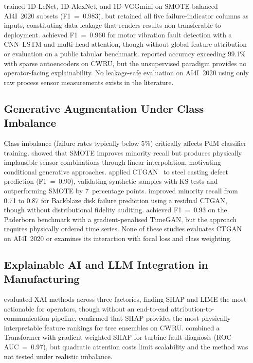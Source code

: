 \documentclass[sensors,article,submit,pdftex,moreauthors]{Definitions/mdpi}
\begin{document}
\citet{ref-base-ileri2024} trained 1D-LeNet, 1D-AlexNet, and
1D-VGGmini on SMOTE-balanced AI4I~2020 subsets (F1~=~0.983), but
retained all five failure-indicator columns as inputs, constituting
data leakage that renders results non-transferable to deployment.
\citet{ref-cnn-lstm-fault2023} achieved F1~=~0.960 for motor vibration
fault detection with a CNN--LSTM and multi-head attention, though
without global feature attribution or evaluation on a public tabular
benchmark.
\citet{ref-autoencoder-pdm2023} reported accuracy exceeding 99.1\%
with sparse autoencoders on CWRU, but the unsupervised paradigm
provides no operator-facing explainability.
No leakage-safe evaluation on AI4I~2020 using only raw process sensor
measurements exists in the literature.

\subsection{Generative Augmentation Under Class Imbalance}

Class imbalance (failure rates typically below 5\%) critically affects
PdM classifier training.
\citet{ref-smote-fault2022} showed that SMOTE improves minority recall
but produces physically implausible sensor combinations through linear
interpolation, motivating conditional generative approaches.
\citet{ref-ctgan-steel2025} applied CTGAN~\citep{ref-ctgan-original}
to steel casting defect prediction (F1~=~0.90), validating synthetic
samples with KS tests and outperforming SMOTE by 7~percentage points.
\citet{ref-rctgan-disk2023} improved minority recall from 0.71 to
0.87 for Backblaze disk failure prediction using a residual CTGAN,
though without distributional fidelity auditing.
\citet{ref-ctgan-timegan2025} achieved F1~=~0.93 on the Paderborn
benchmark with a gradient-penalised TimeGAN, but the approach requires
physically ordered time series.
None of these studies evaluates CTGAN on AI4I~2020 or examines its
interaction with focal loss and class weighting.

\subsection{Explainable AI and LLM Integration in Manufacturing}

\citet{ref-xai-smart-mfg2025} evaluated XAI methods across three
factories, finding SHAP and LIME the most actionable for operators,
though without an end-to-end attribution-to-communication pipeline.
\citet{ref-xai-rotating2024} confirmed that SHAP provides the most
physically interpretable feature rankings for tree ensembles on CWRU.
\citet{ref-transformer-xai-2024} combined a Transformer with
gradient-weighted SHAP for turbine fault diagnosis
(ROC-AUC~=~0.97), but quadratic attention costs limit scalability
and the method was not tested under realistic imbalance.
\end{document}
